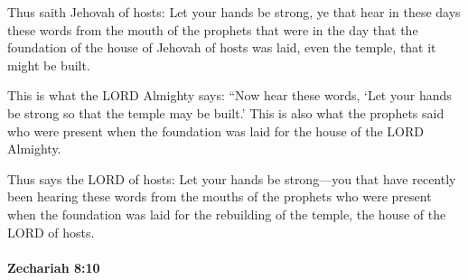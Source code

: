 			\begin{versebox}
					\item[BHS] 
					\item[LXX] 
					\item[ASV] Thus saith Jehovah of hosts: Let your hands be strong, ye that hear in these days these words from the mouth of the prophets that were in the day that the foundation of the house of Jehovah of hosts was laid, even the temple, that it might be built.
					\item[NIV] This is what the LORD Almighty says: “Now hear these words, ‘Let your hands be strong so that the temple may be built.’ This is also what the prophets said who were present when the foundation was laid for the house of the LORD Almighty.
					\item[NRSV] Thus says the LORD of hosts: Let your hands be strong—you that have recently been hearing these words from the mouths of the prophets who were present when the foundation was laid for the rebuilding of the temple, the house of the LORD of hosts.
			\end{versebox}

		\paragraph{Zechariah 8:10} %
			\label{ZECHARIAH-8-10}

